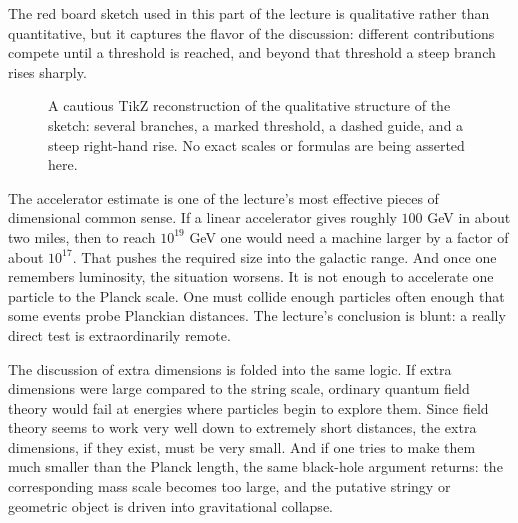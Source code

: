 The red board sketch used in this part of the lecture is qualitative rather than quantitative, but it captures the flavor of the discussion: different contributions compete until a threshold is reached, and beyond that threshold a steep branch rises sharply.

\begin{figure}[t]
\centering
{}
\caption{A cautious TikZ reconstruction of the qualitative structure of the sketch: several branches, a marked threshold, a dashed guide, and a steep right-hand rise. No exact scales or formulas are being asserted here.}
\end{figure}

The accelerator estimate is one of the lecture's most effective pieces of dimensional common sense. If a linear accelerator gives roughly \(100\) GeV in about two miles, then to reach \(10^{19}\) GeV one would need a machine larger by a factor of about \(10^{17}\). That pushes the required size into the galactic range. And once one remembers luminosity, the situation worsens. It is not enough to accelerate one particle to the Planck scale. One must collide enough particles often enough that some events probe Planckian distances. The lecture's conclusion is blunt: a really direct test is extraordinarily remote.

The discussion of extra dimensions is folded into the same logic. If extra dimensions were large compared to the string scale, ordinary quantum field theory would fail at energies where particles begin to explore them. Since field theory seems to work very well down to extremely short distances, the extra dimensions, if they exist, must be very small. And if one tries to make them much smaller than the Planck length, the same black-hole argument returns: the corresponding mass scale becomes too large, and the putative stringy or geometric object is driven into gravitational collapse.

